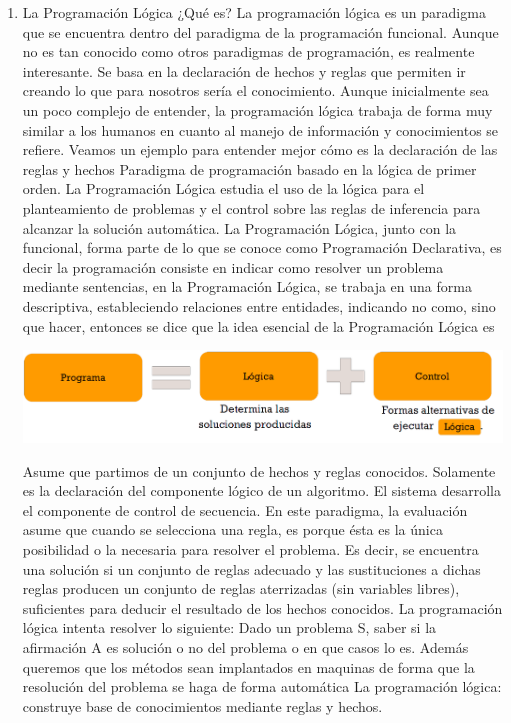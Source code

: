 \begin{enumerate}[1.]
	\item La Programación Lógica  
¿Qué es?
La programación lógica es un paradigma que se encuentra dentro del paradigma de la programación funcional. Aunque no es tan conocido como otros paradigmas de programación, es realmente interesante. Se basa en la declaración de hechos y reglas que permiten ir creando lo que para nosotros sería el conocimiento. Aunque inicialmente sea un poco complejo de entender, la programación lógica trabaja de forma muy similar a los humanos en cuanto al manejo de información y conocimientos se refiere. Veamos un ejemplo para entender mejor cómo es la declaración de las reglas y hechos
Paradigma de programación basado en la lógica de primer orden. La Programación Lógica estudia el uso de la lógica para el planteamiento de problemas y el control sobre las reglas de inferencia para alcanzar la solución automática.
La Programación Lógica, junto con la funcional, forma parte de lo que se conoce como Programación Declarativa, es decir la programación consiste en indicar como resolver un problema mediante sentencias, en la Programación Lógica, se trabaja en una forma descriptiva, estableciendo relaciones entre entidades, indicando no como, sino que hacer, entonces se dice que la idea esencial de la Programación Lógica es

\begin{center}
\includegraphics[width=14cm]{./Imagenes/img02} 
\end{center}

Asume que partimos de un conjunto de hechos y reglas conocidos. Solamente es la declaración del componente lógico de un algoritmo. El sistema desarrolla el componente de control de secuencia. En este paradigma, la evaluación asume que cuando se selecciona una regla, es porque ésta es la única posibilidad o la necesaria para resolver el problema. Es decir, se encuentra una solución si un conjunto de reglas adecuado y las sustituciones a dichas reglas producen un conjunto de reglas aterrizadas (sin variables libres), suficientes para deducir el resultado de los hechos conocidos.
La programación lógica intenta resolver lo siguiente:
Dado un problema S, saber si la afirmación A es solución o no del problema o en que casos lo es. Además queremos que los métodos sean implantados en maquinas de forma que la resolución del problema se haga de forma automática
La programación lógica: construye base de conocimientos mediante reglas y hechos.


\end{enumerate}
